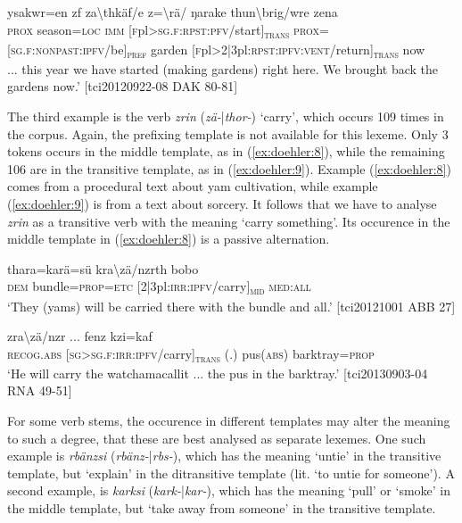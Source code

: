 \documentclass[output=paper]{langscibook}
\begin{document}
	\ex
			 {ysakwr=en} {zf} {za\textbackslash{thkäf}/e} {z=\textbackslash{rä}}/ {ŋarake} {thun\textbackslash{brig}/wre} {zena}\\
			\textsc{prox}{} season=\textsc{loc}{} \textsc{imm}{} [\textsc{f}pl>\textsc{sg}.\textsc{f}:\textsc{rpst}:\textsc{pfv}/start]\textsubscript{\textsc{trans}} \textsc{prox}=[\textsc{sg}.\textsc{f}:\textsc{nonpast}:\textsc{ipfv}/be]\textsubscript{\textsc{pref}} garden [\textsc{f}pl>2|3pl:\textsc{rpst}:\textsc{ipfv}:\textsc{vent}/return]\textsubscript{\textsc{trans}} now\\
			\glt ... this year we have started (making gardens) right here. We brought back the gardens now.' [tci20120922-08 DAK 80-81]
			\label{ex:doehler:7b}
		\z
	\z


The third example is the verb \emph{zrin} (\emph{zä-}|\emph{thor-}) `carry', which occurs 109 times in the corpus. Again, the prefixing template is not available for this lexeme. Only 3 tokens occurs in the middle template, as in (\ref{ex:doehler:8}), while the remaining 106 are in the transitive template, as in (\ref{ex:doehler:9}). Example (\ref{ex:doehler:8}) comes from a procedural text about yam cultivation, while example (\ref{ex:doehler:9}) is from a text about sorcery. It follows that we have to analyse \emph{zrin} as a transitive verb with the meaning `carry something'. Its occurence in the middle template in (\ref{ex:doehler:8}) is a passive alternation.


\ea
	 {thara=karä=sü} {kra\textbackslash{zä}/nzrth} {bobo}\\
	\textsc{dem}{} bundle=\textsc{prop}=\textsc{etc}{} [2|3pl:\textsc{irr}:\textsc{ipfv}/carry]\textsubscript{\textsc{mid}} \textsc{med}:\textsc{all}\\
	\glt `They (yams) will be carried there with the bundle and all.' [tci20121001 ABB 27]
	\label{ex:doehler:8}
\z


\ea
    	\label{ex:doehler:9}
	 {zra\textbackslash{zä}/nzr} ... {fenz} {kzi=kaf}\\
	\textsc{recog}.\textsc{abs}{} [\textsc{sg}>\textsc{sg}.\textsc{f}:\textsc{irr}:\textsc{ipfv}/carry]\textsubscript{\textsc{trans}} (.) pus(\textsc{abs}) barktray=\textsc{prop}\\
	\glt `He will carry the watchamacallit ... the pus in the barktray.' [tci20130903-04 RNA 49-51]
\z


For some verb stems, the occurence in different templates may alter the meaning to such a degree, that these are best analysed as separate lexemes. One such example is \emph{rbänzsi} (\emph{rbänz-}|\emph{rbs-}), which has the meaning `untie' in the transitive template, but `explain' in the ditransitive template (lit. `to untie for someone'). A second example, is \emph{karksi} (\emph{kark-}|\emph{kar-}), which has the meaning `pull' or `smoke' in the middle template, but `take away from someone' in the transitive template.
\end{document}
